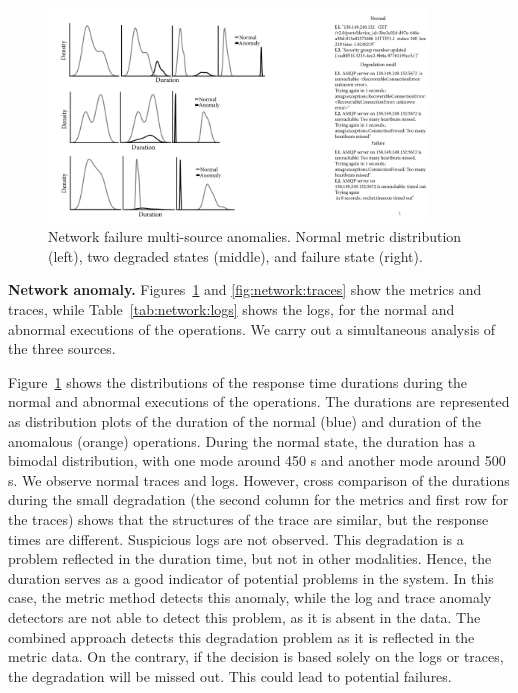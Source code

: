 \begin{figure}[!t]
\centerline{\includegraphics[width=0.9\textwidth]{gfx/chap7/metricsnetworkfailiure.pdf}}
\caption{Network failure multi-source anomalies. Normal metric distribution (left), two degraded states (middle), and failure state (right).}
\label{fig:network:metrics}
\end{figure}


\textbf{Network anomaly.}
Figures~\ref{fig:network:metrics} and \ref{fig:network:traces} show the metrics and traces, while Table~\ref{tab:network:logs} shows the logs, for the normal and abnormal executions of the operations. We carry out a simultaneous analysis of the three sources.


Figure~\ref{fig:network:metrics} shows the distributions of the response time durations during the normal and abnormal executions of the operations. The durations are represented as distribution plots of the duration of the normal (blue) and duration of the anomalous (orange) operations. During the normal state, the duration has a bimodal distribution, with one mode around 450 s and another mode around 500 s. We observe normal traces and logs. However, cross comparison of the durations during the small degradation (the second column for the metrics and first row for the traces) shows that the structures of the trace are similar, but the response times are different. Suspicious logs are not observed. This degradation is a problem reflected in the duration time, but not in other modalities. Hence, the duration serves as a good indicator of potential problems in the system. In this case, the metric method detects this anomaly, while the log and trace anomaly detectors are not able to detect this problem, as it is absent in the data. The combined approach detects this degradation problem as it is reflected in the metric data. On the contrary, if the decision is based solely on the logs or traces, the degradation will be missed out. This could lead to potential failures. 

